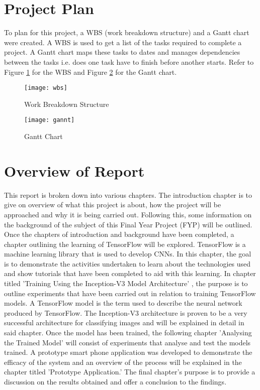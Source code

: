 \begin{enumerate}
{\section{Project Plan}
To plan for this project, a WBS (work breakdown structure) and a Gantt chart were created.
A WBS is used to get a list of the tasks required to complete a project.
A Gantt chart maps these tasks to dates and manages dependencies between the tasks i.e. does one task have to finish before another starts.
Refer to Figure \ref{fig:wbs} for the WBS and Figure \ref{fig:gantt} for the Gantt chart.

\begin{figure}[h]
  \centering
  \texttt{[image: wbs]}
  \caption{Work Breakdown Structure}
  \label{fig:wbs}
\end{figure}

\begin{figure}[h]
  \centering
  \texttt{[image: gannt]}
  \caption{Gantt Chart}
  \label{fig:gantt}
\end{figure} 

\section{Overview of Report}

This report is broken down into various chapters.
The introduction chapter is to give on overview of what this project is about, how the project will be approached and why it is being carried out.
Following this, some information on the background of the subject of this Final Year Project (FYP) will be outlined. Once the chapters of introduction and background have been completed, a chapter outlining the learning of TensorFlow will be explored. TensorFlow is a machine learning library that is used to develop CNNs. In this chapter, the goal is to demonstrate the activities undertaken to learn about the technologies used and show tutorials that have been completed to aid with this learning.
In chapter titled 'Training Using the Inception-V3 Model Architecture' , the purpose is to outline experiments that have been carried out in relation to training TensorFlow models.
A TensorFlow model is the term used to describe the neural network produced by TensorFlow. 
The Inception-V3 architecture is proven to be a very successful architecture for classifying images and will be explained in detail in said chapter.
Once the model has been trained, the following chapter 'Analysing the Trained Model' will consist of experiments that analyse and test the models trained.
A prototype smart phone application was developed to demonstrate the efficacy of the system and an overview of the process will be explained in the chapter titled 'Prototype Application.'
The final chapter's purpose is to provide a discussion on the results obtained and offer a conclusion to the findings.

}
\end{enumerate}
